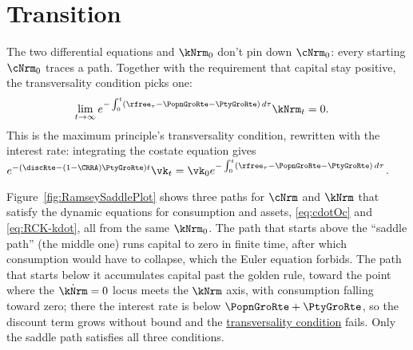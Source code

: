\documentclass{econark}
\begin{document}
\section{Transition}

The two differential equations and $\kNrm_{0}$ don't pin down $\cNrm_{0}$: every starting $\cNrm_{0}$ traces a path. Together with the requirement that capital stay positive, the transversality condition picks one:
\begin{equation}\begin{gathered}\begin{aligned}
  \lim_{t \rightarrow \infty} e^{-\int_{0}^{t} (\rfree_{\tau} -\PopnGroRte -\PtyGroRte)\,d\tau }\kNrm_{t} & =  0. \label{eq:tvc}
\end{aligned}\end{gathered}\end{equation}
This is the maximum principle's transversality condition, rewritten with the interest rate: integrating the costate equation gives $e^{-(\discRte-(1-\CRRA)\PtyGroRte)t}\vk_{t} = \vk_{0}e^{-\int_{0}^{t}(\rfree_{\tau}-\PopnGroRte-\PtyGroRte)\,d\tau}$.

Figure~\ref{fig:RamseySaddlePlot} shows three paths for $\cNrm$ and $\kNrm$ that satisfy the dynamic equations for consumption and assets, \eqref{eq:cdotOc} and \eqref{eq:RCK-kdot}, all from the same $\kNrm_{0}$. The path that starts above the ``saddle path'' (the middle one) runs capital to zero in finite time, after which consumption would have to collapse, which the Euler equation forbids. The path that starts below it accumulates capital past the golden rule, toward the point where the $\dot{\kNrm}=0$ locus meets the $\kNrm$ axis, with consumption falling toward zero; there the interest rate is below $\PopnGroRte+\PtyGroRte$, so the discount term grows without bound and the \hyperref[eq:tvc]{transversality condition} fails. Only the saddle path satisfies all three conditions.
\end{document}
